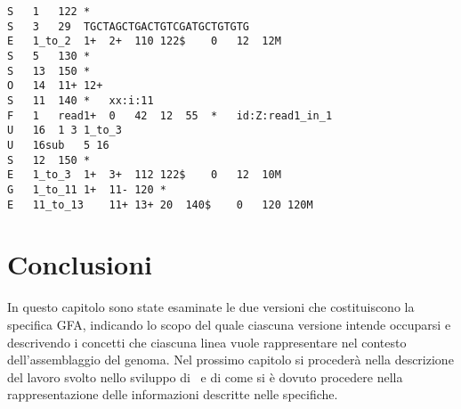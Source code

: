 \captionsetup{justification=centering, singlelinecheck=false}
\begin{lstlisting}[basicstyle=\ttfamily\scriptsize, frame=topline, caption=Un esempio di file GFA 2.]
S	1	122	*
S	3	29	TGCTAGCTGACTGTCGATGCTGTGTG
E	1_to_2	1+	2+	110	122$	0	12	12M
S	5	130	*
S	13	150	*
O	14	11+ 12+
S	11	140	*	xx:i:11
F	1	read1+	0	42	12	55	*	id:Z:read1_in_1
U	16	1 3 1_to_3
U	16sub	5 16
S	12	150	*
E	1_to_3	1+	3+	112	122$	0	12	10M
G	1_to_11	1+	11-	120	*
E	11_to_13	11+	13+	20	140$	0	120	120M
\end{lstlisting}
\captionsetup{justification=justified, singlelinecheck=false}

\section{Conclusioni}
In questo capitolo sono state esaminate le due versioni che costituiscono
la specifica GFA, indicando lo scopo del quale ciascuna versione intende
occuparsi e descrivendo i concetti che ciascuna linea vuole rappresentare
nel contesto dell'assemblaggio del genoma. Nel prossimo
capitolo si procederà nella descrizione del lavoro svolto nello sviluppo
di \pygfa \  e di come si è dovuto procedere nella rappresentazione delle
informazioni descritte nelle specifiche.